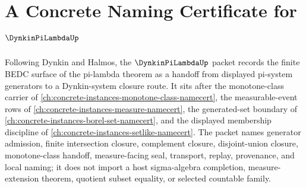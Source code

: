 \chapter{A Concrete Naming Certificate for $\DynkinPiLambdaUp$}
\label{ch:concrete-instances-dynkin-pi-lambda-namecert}

Following Dynkin and Halmos, the $\DynkinPiLambdaUp$ packet records the finite BEDC surface of the pi-lambda theorem as a handoff from displayed pi-system generators to a Dynkin-system closure route. It sits after the monotone-class carrier of \autoref{ch:concrete-instances-monotone-class-namecert}, the measurable-event rows of \autoref{ch:concrete-instances-measure-namecert}, the generated-set boundary of \autoref{ch:concrete-instances-borel-set-namecert}, and the displayed membership discipline of \autoref{ch:concrete-instances-setlike-namecert}. The packet names generator admission, finite intersection closure, complement closure, disjoint-union closure, monotone-class handoff, measure-facing seal, transport, replay, provenance, and local naming; it does not import a host sigma-algebra completion, measure-extension theorem, quotient subset equality, or selected countable family.

